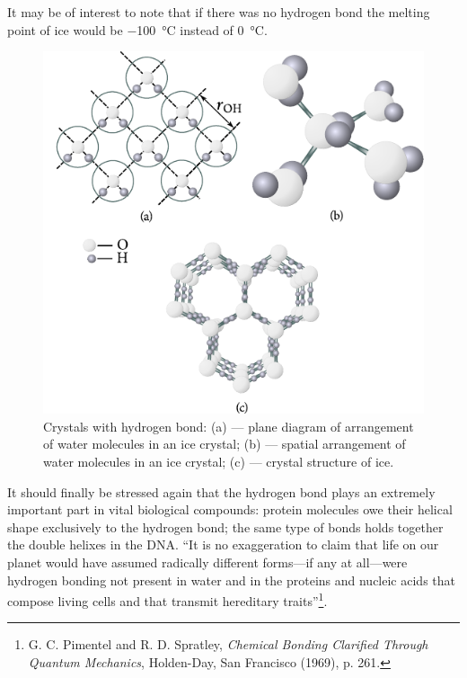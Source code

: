 It may be of interest to note that if there was no hydrogen bond the melting point of ice would be \SI{-100}{\degreeCelsius} instead of \SI{0}{\degreeCelsius}.

\begin{figure}[t]
	\begin{center}
		\includegraphics[scale=1.0]{figures/ch_01/fig_1_23.pdf}
		\caption[]{Crystals with hydrogen bond: (a) --- plane diagram of arrangement of water molecules in an ice crystal; (b) --- spatial arrangement of water molecules in an ice crystal; (c) --- crystal structure of ice.}
		\label{fig:1_23}
	\end{center}
	\vspace{-0.7cm}
\end{figure}

It should finally be stressed again that the hydrogen bond plays an extremely important part in vital biological compounds: protein molecules owe their helical shape exclusively to the hydrogen bond; the same type of bonds holds together the double helixes in the DNA. ``It is no exaggeration to claim that life on our planet would have assumed radically different forms---if any at all---were hydrogen bonding not present in water and in the proteins and nucleic acids that compose living cells and that transmit hereditary traits''\footnote{G. C. Pimentel and R. D. Spratley, \textit{Chemical Bonding Clarified Through
Quantum Mechanics}, Holden-Day, San Francisco (1969), p. 261.}.

